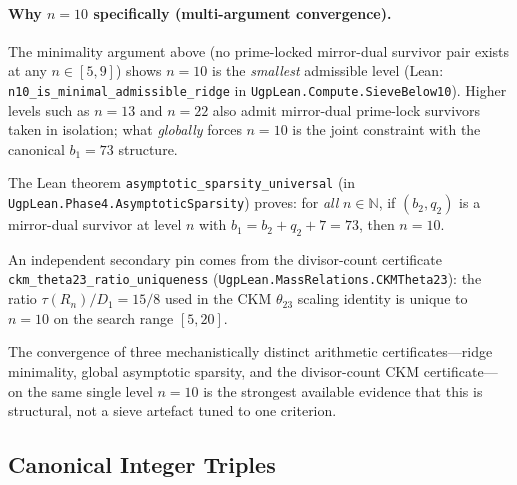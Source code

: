 \documentclass[11pt]{article}
\theoremstyle{remark}
\begin{document}
\paragraph{Why $n{=}10$ specifically (multi-argument convergence).}
The minimality argument above (no prime-locked mirror-dual survivor pair exists at any $n \in [5, 9]$) shows $n{=}10$ is the \emph{smallest} admissible level (Lean: \texttt{n10\_is\_minimal\_admissible\_ridge} in \texttt{UgpLean.Compute.SieveBelow10}).  Higher levels such as $n{=}13$ and $n{=}22$ also admit mirror-dual prime-lock survivors taken in isolation; what \emph{globally} forces $n{=}10$ is the joint constraint with the canonical $b_1{=}73$ structure.

\smallskip
\begin{sloppypar}
The Lean theorem \texttt{asymptotic\_sparsity\_universal} (in \texttt{UgpLean.\allowbreak Phase4.\allowbreak AsymptoticSparsity}) proves: for \emph{all} $n \in \mathbb{N}$, if $(b_2, q_2)$ is a mirror-dual survivor at level $n$ with $b_1 = b_2 + q_2 + 7 = 73$, then $n = 10$.
\end{sloppypar}

\smallskip
\begin{sloppypar}
An independent secondary pin comes from the divisor-count certificate \texttt{ckm\_theta23\_ratio\_uniqueness} (\texttt{UgpLean.MassRelations.CKMTheta23}): the ratio $\tau(R_n)/D_1 = 15/8$ used in the CKM $\theta_{23}$ scaling identity is unique to $n{=}10$ on the search range $[5, 20]$.
\end{sloppypar}

\smallskip
The convergence of three mechanistically distinct arithmetic certificates---ridge minimality, global asymptotic sparsity, and the divisor-count CKM certificate---on the same single level $n{=}10$ is the strongest available evidence that this is structural, not a sieve artefact tuned to one criterion.


\subsection{Canonical Integer Triples}
\label{subsec:triples}
\end{document}
